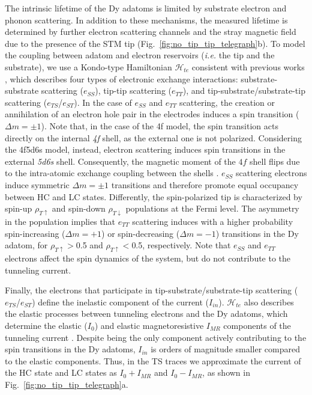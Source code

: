 \documentclass[
reprint,amsmath,amssymb,aps]{revtex4-2}
\begin{document}
The intrinsic lifetime of the Dy adatoms is limited by substrate electron and phonon scattering. In addition to these mechanisms, the measured lifetime is determined by further electron scattering channels and the stray magnetic field due to the presence of the STM tip (Fig.~\ref{fig:no_tip_tip_telegraph}b).
To model the coupling between adatom and electron reservoirs (\textit{i.e.} the tip and the substrate), we use a Kondo-type Hamiltonian $\mathcal{H}_{te}$ consistent with previous works \cite{anderson1966,schrieffer1966,appelbaum1967,delgado2010,loth2010,Ternes2015}, which describes four types of electronic exchange interactions: substrate-substrate scattering ($e_{SS}$), tip-tip scattering ($e_{TT}$), and tip-substrate/substrate-tip scattering ($e_{TS}$/$e_{ST}$). In the case of $e_{SS}$ and $e_{TT}$ scattering, the creation or annihilation of an electron hole pair in the electrodes induces a spin transition ($\Delta m=\pm 1$).
Note that, in the case of the 4f model, the spin transition acts directly on the internal \textit{4f} shell, as the external one is not polarized.
Considering the 4f5d6s model, instead, electron scattering induces spin transitions in the external \textit{5d6s} shell. Consequently, the magnetic moment of the $4f$ shell flips due to the intra-atomic exchange coupling between the shells \cite{pivettaMeasuringIntraAtomicExchange2020}.
$e_{SS}$ scattering electrons induce symmetric $\Delta m=\pm 1$ transitions and therefore promote equal occupancy between HC and LC states.
Differently, the spin-polarized tip is characterized by spin-up $\rho_{T\uparrow}$ and spin-down $\rho_{T\downarrow}$ populations at the Fermi level. The asymmetry in the population implies that $e_{TT}$ scattering induces with a higher probability spin-increasing ($\Delta m=+1$)  or spin-decreasing ($\Delta m=-1$) transitions in the Dy adatom, for $\rho_{T\uparrow}>$0.5 and $\rho_{T\uparrow}<$0.5, respectively.
Note that $e_{SS}$ and $e_{TT}$ electrons affect the spin dynamics of the system, but do not contribute to the tunneling current.

Finally, the electrons that participate in tip-substrate/substrate-tip scattering ($e_{TS}$/$e_{ST}$) define the inelastic component of the current ($I_{in}$). $\mathcal{H}_{te}$ also describes the elastic processes between tunneling electrons and the Dy adatoms, which determine the elastic ($I_0$) and elastic magnetoresistive $I_{MR}$ components of the tunneling current \cite{delgado2010}.
Despite being the only component actively contributing to the spin transitions in the Dy adatoms, $I_{in}$ is orders of magnitude smaller compared to the elastic components. Thus, in the TS traces we approximate the current of the HC state and LC states as $I_0+I_{MR}$ and $I_0-I_{MR}$, as shown in Fig.~\ref{fig:no_tip_tip_telegraph}a.
\end{document}

